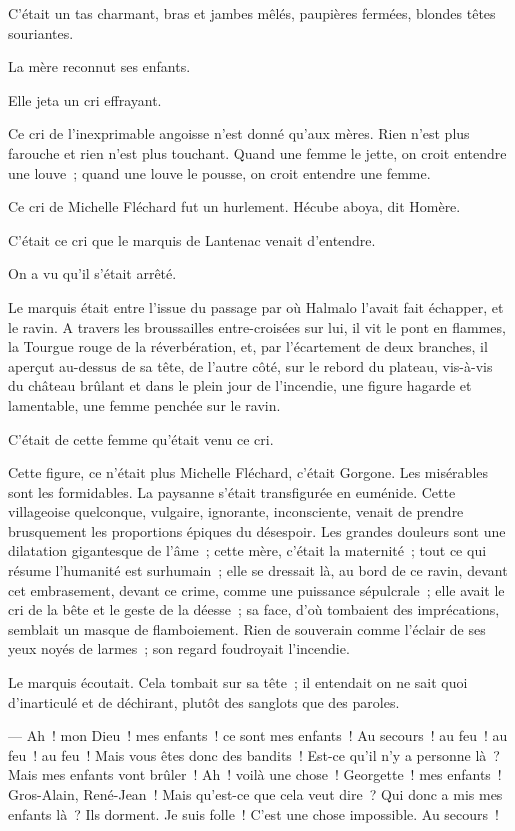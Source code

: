 \documentclass[french,twoside]{book} %
\begin{document}
C’était un tas charmant, bras et jambes mêlés, paupières fermées, blondes têtes souriantes.\par
La mère reconnut ses enfants.\par
Elle jeta un cri effrayant.\par
Ce cri de l’inexprimable angoisse n’est donné qu’aux mères. Rien n’est plus farouche et rien n’est plus touchant. Quand une femme le jette, on croit entendre une louve ; quand une louve le pousse, on croit entendre une femme.\par
Ce cri de Michelle Fléchard fut un hurlement. Hécube aboya, dit Homère.\par
C’était ce cri que le marquis de Lantenac venait d’entendre.\par
On a vu qu’il s’était arrêté.\par
Le marquis était entre l’issue du passage par où Halmalo l’avait fait échapper, et le ravin. A travers les broussailles entre-croisées sur lui, il vit le pont en flammes, la Tourgue rouge de la réverbération, et, par l’écartement de deux branches, il aperçut au-dessus de sa tête, de l’autre côté, sur le rebord du plateau, vis-à-vis du château brûlant et dans le plein jour de l’incendie, une figure hagarde et lamentable, une femme penchée sur le ravin.\par
 C’était de cette femme qu’était venu ce cri.\par
Cette figure, ce n’était plus Michelle Fléchard, c’était Gorgone. Les misérables sont les formidables. La paysanne s’était transfigurée en euménide. Cette villageoise quelconque, vulgaire, ignorante, inconsciente, venait de prendre brusquement les proportions épiques du désespoir. Les grandes douleurs sont une dilatation gigantesque de l’âme ; cette mère, c’était la maternité ; tout ce qui résume l’humanité est surhumain ; elle se dressait là, au bord de ce ravin, devant cet embrasement, devant ce crime, comme une puissance sépulcrale ; elle avait le cri de la bête et le geste de la déesse ; sa face, d’où tombaient des imprécations, semblait un masque de flamboiement. Rien de souverain comme l’éclair de ses yeux noyés de larmes ; son regard foudroyait l’incendie.\par
Le marquis écoutait. Cela tombait sur sa tête ; il entendait on ne sait quoi d’inarticulé et de déchirant, plutôt des sanglots que des paroles.\par
— Ah ! mon Dieu ! mes enfants ! ce sont mes enfants ! Au secours ! au feu ! au feu ! au feu ! Mais vous êtes donc des bandits ! Est-ce qu’il n’y a personne là ? Mais mes enfants vont brûler ! Ah ! voilà une chose ! Georgette ! mes enfants ! Gros-Alain, René-Jean ! Mais qu’est-ce que cela veut dire ? Qui donc a mis mes enfants là ? Ils dorment. Je suis folle ! C’est une chose impossible. Au secours !\par
\end{document}
